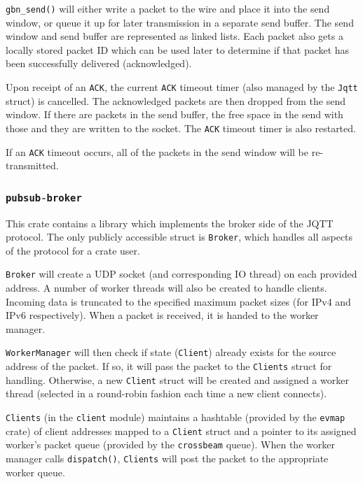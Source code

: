 \documentclass[a4paper]{article}
\numberwithin{figure}{section}
\numberwithin{table}{section}
\newcommand{\mi}{\mintinline}
\begin{document}
\mi{rust}{gbn_send()} will either write a packet to the wire and place it into the send window, or queue it up for later transmission in a separate send buffer. The send window and send buffer are represented as linked lists. Each packet also gets a locally stored packet ID which can be used later to determine if that packet has been successfully delivered (acknowledged).

Upon receipt of an \mi{c}{ACK}, the current \mi{c}{ACK} timeout timer (also managed by the \mi{rust}{Jqtt} struct) is cancelled. The acknowledged packets are then dropped from the send window. If there are packets in the send buffer, the free space in the send with those and they are written to the socket. The \mi{c}{ACK} timeout timer is also restarted.

If an \mi{c}{ACK} timeout occurs, all of the packets in the send window will be re-transmitted.

\subsubsection{\mi{c}{pubsub-broker}}
This crate contains a library which implements the broker side of the JQTT protocol. The only publicly accessible struct is \mi{c}{Broker}, which handles all aspects of the protocol for a crate user.

\medskip
\noindent\mi{rust}{Broker} will create a UDP socket (and corresponding IO thread) on each provided address. A number of worker threads will also be created to handle clients. Incoming data is truncated to the specified maximum packet sizes (for IPv4 and IPv6 respectively). When a packet is received, it is handed to the worker manager.

\mi{rust}{WorkerManager} will then check if state (\mi{rust}{Client}) already exists for the source address of the packet. If so, it will pass the packet to the \mi{rust}{Clients} struct for handling. Otherwise, a new \mi{rust}{Client} struct will be created and assigned a worker thread (selected in a round-robin fashion each time a new client connects).

\mi{rust}{Clients} (in the \mi{c}{client} module) maintains a hashtable (provided by the \mi{rust}{evmap} crate) of client addresses mapped to a \mi{rust}{Client} struct and a pointer to its assigned worker's packet queue (provided by the \mi{rust}{crossbeam} queue). When the worker manager calls \mi{rust}{dispatch()}, \mi{rust}{Clients} will post the packet to the appropriate worker queue.
\end{document}
